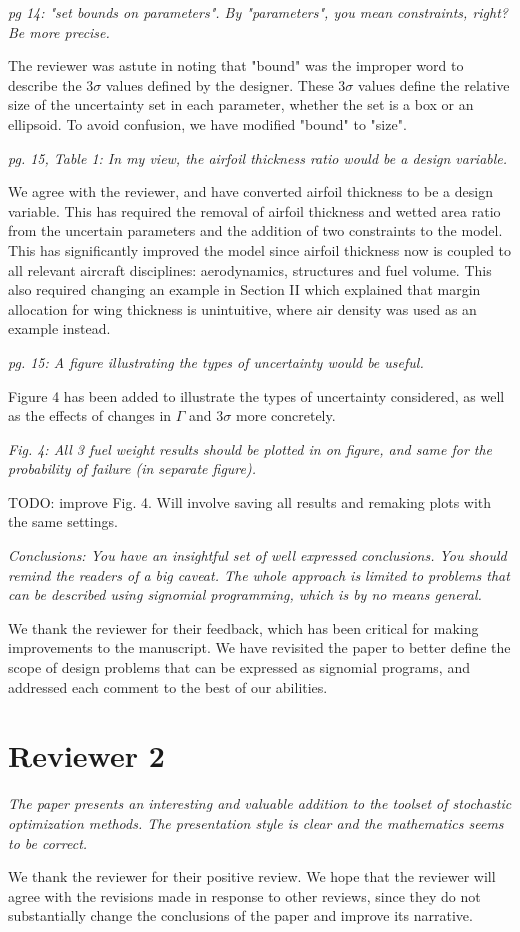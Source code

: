 \documentclass[11pt]{article}
\begin{document}
\textit{pg 14: "set bounds on parameters". By "parameters", you mean constraints, right? Be more precise.}

The reviewer was astute in noting that "bound" was the improper word to describe the $3\sigma$ values
defined by the designer. These $3\sigma$ values define the relative size
of the uncertainty set in each parameter, whether the set is a box or an ellipsoid.
To avoid confusion, we have modified "bound" to "size". 

\textit{pg. 15, Table 1: In my view, the airfoil thickness ratio would be a design variable.}

We agree with the reviewer, and have converted airfoil thickness to be a design variable. 
This has required the removal of airfoil thickness and wetted area ratio from the uncertain parameters
and the addition of two constraints to the model. This has significantly improved the model since 
airfoil thickness now is coupled to all relevant aircraft disciplines: aerodynamics, structures and 
fuel volume. This also required changing an example in Section II 
which explained that margin allocation for wing thickness 
is unintuitive, where air density was used as an example instead. 

\textit{pg. 15: A figure illustrating the types of uncertainty would be useful.}

Figure 4 has been added to illustrate the types of uncertainty considered, 
as well as the effects of changes in $\Gamma$ and $3\sigma$ more concretely. 

\textit{Fig. 4: All 3 fuel weight results should be plotted in on figure, and same for the probability of failure (in separate figure).}

TODO: improve Fig. 4. Will involve saving all results and remaking plots with the same settings. 

\textit{Conclusions: You have an insightful set of well expressed conclusions. You should remind the readers of a big caveat. The whole approach is limited to problems that can be described using signomial programming, which is by no means general.}

We thank the reviewer for their feedback, which has been critical for making improvements to the manuscript. We 
have revisited the paper to better define the scope of design problems that can be expressed as signomial 
programs, and addressed each comment to the best of our abilities. 

\section{Reviewer 2}

\textit{The paper presents an interesting and valuable addition to the toolset of stochastic optimization methods. 
The presentation style is clear and the mathematics seems to be correct.}

We thank the reviewer for their positive review. We hope that the reviewer
will agree with the revisions made in response to other reviews, since
they do not substantially change the conclusions of the paper
and improve its narrative. 
\end{document}

